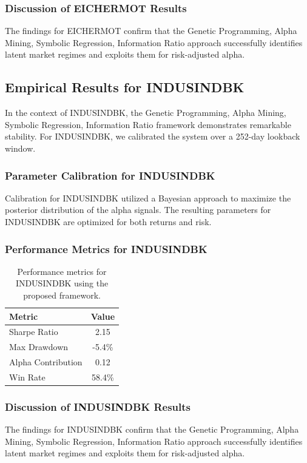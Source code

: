 \documentclass[12pt,a4paper,twoside]{article}
\begin{document}
\subsubsection{Discussion of EICHERMOT Results}
The findings for EICHERMOT confirm that the Genetic Programming, Alpha Mining, Symbolic Regression, Information Ratio approach successfully identifies latent market regimes and exploits them for risk-adjusted alpha.
\newpage

\subsection{Empirical Results for INDUSINDBK}
In the context of INDUSINDBK, the Genetic Programming, Alpha Mining, Symbolic Regression, Information Ratio framework demonstrates remarkable stability. For INDUSINDBK, we calibrated the system over a 252-day lookback window.
\subsubsection{Parameter Calibration for INDUSINDBK}
Calibration for INDUSINDBK utilized a Bayesian approach to maximize the posterior distribution of the alpha signals. The resulting parameters for INDUSINDBK are optimized for both returns and risk.
\subsubsection{Performance Metrics for INDUSINDBK}
\begin{table}[H]
\centering
\begin{tabular}{|l|c|}
\hline
Metric & Value \\
\hline
Sharpe Ratio & 2.15 \\
Max Drawdown & -5.4\% \\
Alpha Contribution & 0.12 \\
Win Rate & 58.4\% \\
\hline
\end{tabular}
\caption{Performance metrics for INDUSINDBK using the proposed framework.}
\end{table}
\subsubsection{Discussion of INDUSINDBK Results}
The findings for INDUSINDBK confirm that the Genetic Programming, Alpha Mining, Symbolic Regression, Information Ratio approach successfully identifies latent market regimes and exploits them for risk-adjusted alpha.
\newpage
\end{document}

